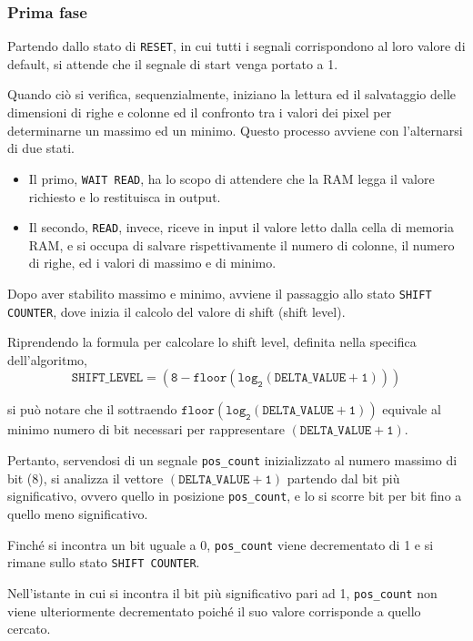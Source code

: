 \documentclass[11pt]{article}
\begin{document}
        \subsubsection{Prima fase}
        Partendo dallo stato di \texttt{RESET}, in cui tutti i segnali corrispondono al loro valore di default, si attende che il segnale di start venga portato a 1.
        
        Quando ciò si verifica, sequenzialmente, iniziano la lettura ed il salvataggio delle dimensioni di righe e colonne ed il confronto tra i valori dei pixel per determinarne un massimo ed un minimo. Questo processo avviene con l'alternarsi di due stati.
        \begin{itemize}
            \item Il primo, \texttt{WAIT READ}, ha lo scopo di attendere che la RAM legga il valore richiesto e lo restituisca in output.
            \item Il secondo, \texttt{READ}, invece, riceve in input il valore letto dalla cella di memoria RAM, e si occupa di salvare rispettivamente il numero di colonne, il numero di righe, ed i valori di massimo e di minimo.
        \end{itemize}
        
        Dopo aver stabilito massimo e minimo, avviene il passaggio allo stato \texttt{SHIFT COUNTER}, dove inizia il calcolo del valore di shift (shift level).
        
        Riprendendo la formula per calcolare lo shift level, definita nella specifica dell'algoritmo,
        $$\mathtt{
        SHIFT\_LEVEL = (8 - floor(log_2(DELTA\_VALUE + 1)))
        }$$
        
        si può notare che il sottraendo $\mathtt{floor(log_2(DELTA\_VALUE + 1))}$ equivale al minimo numero di bit necessari per rappresentare $\mathtt{(DELTA\_VALUE + 1)}$.
        
        Pertanto, servendosi di un segnale \texttt{pos\_count} inizializzato al numero massimo di bit (8), si analizza il vettore $\mathtt{(DELTA\_VALUE + 1)}$ partendo dal bit più significativo, ovvero quello in posizione \texttt{pos\_count}, e lo si scorre bit per bit fino a quello meno significativo.
       
        Finché si incontra un bit uguale a 0, \texttt{pos\_count} viene decrementato di 1 e si rimane sullo stato \texttt{SHIFT COUNTER}.
        
        Nell'istante in cui si incontra il bit più significativo pari ad 1, \texttt{pos\_count} non viene ulteriormente decrementato poiché il suo valore corrisponde a quello cercato.
        
\end{document}
